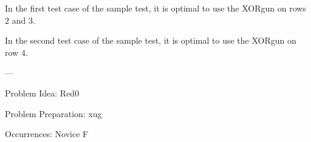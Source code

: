 In the first test case of the sample test, it is optimal to use the XORgun on rows $2$ and $3$.

In the second test case of the sample test, it is optimal to use the XORgun on row $4$.


---

Problem Idea: Red0

Problem Preparation: xug

Occurrences: Novice F
